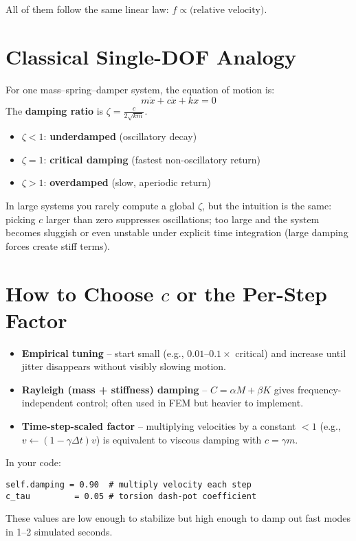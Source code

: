 \documentclass{article}
\begin{document}
All of them follow the same linear law: $f \propto \text{(relative velocity)}$.

\hrulefill
\section{Classical Single-DOF Analogy}

For one mass–spring–damper system, the equation of motion is:
\begin{equation}
    m\ddot{x} + c\dot{x} + kx = 0
\end{equation}
The \textbf{damping ratio} is $\zeta = \frac{c}{2\sqrt{km}}$.
\begin{itemize}
    \item $\zeta < 1$: \textbf{underdamped} (oscillatory decay)
    \item $\zeta = 1$: \textbf{critical damping} (fastest non-oscillatory return)
    \item $\zeta > 1$: \textbf{overdamped} (slow, aperiodic return)
\end{itemize}
In large systems you rarely compute a global $\zeta$, but the intuition is the same: picking $c$ larger than zero suppresses oscillations; too large and the system becomes sluggish or even unstable under explicit time integration (large damping forces create stiff terms).

\hrulefill
\section{How to Choose \texorpdfstring{$c$}{c} or the Per-Step Factor}
\begin{itemize}
    \item \textbf{Empirical tuning} – start small (e.g., $0.01$–$0.1 \times$ critical) and increase until jitter disappears without visibly slowing motion.
    \item \textbf{Rayleigh (mass + stiffness) damping} – $C = \alpha M + \beta K$ gives frequency-independent control; often used in FEM but heavier to implement.
    \item \textbf{Time-step-scaled factor} – multiplying velocities by a constant $< 1$ (e.g., $v \leftarrow (1-\gamma\Delta t)v$) is equivalent to viscous damping with $c = \gamma m$.
\end{itemize}

In your code:
\begin{verbatim}
self.damping = 0.90  # multiply velocity each step
c_tau         = 0.05 # torsion dash-pot coefficient
\end{verbatim}
These values are low enough to stabilize but high enough to damp out fast modes in 1–2 simulated seconds.
\end{document}
